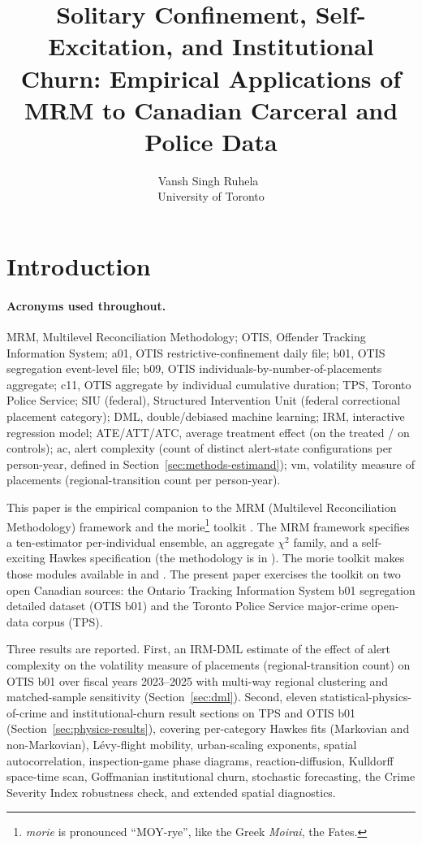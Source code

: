 \documentclass[article,shortnames,nojss]{jss}
\title{Solitary Confinement, Self-Excitation, and Institutional Churn: Empirical Applications of MRM to Canadian Carceral and Police Data}
\author{Vansh Singh Ruhela~\orcidlink{0009-0004-1750-3592}\\University of Toronto}
\newcommand{\OTIS}{\textsf{OTIS}}
\newcommand{\TPS}{\textsf{TPS}}
\newcommand{\ac}{\ensuremath{\mathrm{ac}}}
\newcommand{\vm}{\ensuremath{\mathrm{vm}}}
\begin{document}
\sloppy

\clearpage

\section{Introduction}
\label{sec:intro}

\paragraph*{Acronyms used throughout.}
MRM, Multilevel Reconciliation Methodology;
OTIS, Offender Tracking Information System;
a01, OTIS restrictive-confinement daily file;
b01, OTIS segregation event-level file;
b09, OTIS individuals-by-number-of-placements aggregate;
c11, OTIS aggregate by individual cumulative duration;
TPS, Toronto Police Service;
SIU (federal), Structured Intervention Unit (federal correctional placement category);
DML, double/debiased machine learning;
IRM, interactive regression model;
ATE/ATT/ATC, average treatment effect (on the treated / on controls);
\ac, alert complexity (count of distinct alert-state configurations per person-year, defined in Section~\ref{sec:methods-estimand});
\vm, volatility measure of placements (regional-transition count per person-year).

This paper is the empirical companion to the MRM (Multilevel Reconciliation Methodology)
framework \citep{Ruhela2026MRM} and the morie\footnote{\textit{morie}
is pronounced ``MOY-rye'', like the Greek \textit{Moirai},
the Fates.} toolkit
\citep{Ruhela2026MorieR, Ruhela2026MoriePy}. The MRM framework
specifies a ten-estimator per-individual ensemble, an aggregate
$\chi^{2}$ family, and a self-exciting Hawkes specification (the methodology is in
\citealt{Ruhela2026Hawkes}). The morie toolkit makes those modules
available in  and . The present paper
exercises the toolkit on two open Canadian sources: the Ontario
Tracking Information System b01 segregation detailed dataset
(\OTIS{} b01) and the Toronto Police Service major-crime open-data
corpus (\TPS{}).

Three results are reported. First, an IRM-DML estimate of the effect
of alert complexity on the volatility measure of placements (regional-transition count) on \OTIS{} b01 over fiscal
years 2023--2025 with multi-way regional clustering and matched-sample
sensitivity (Section~\ref{sec:dml}). Second, eleven statistical-physics-of-crime and institutional-churn
result sections on \TPS{} and \OTIS{} b01 (Section~\ref{sec:physics-results}),
covering per-category Hawkes fits (Markovian and non-Markovian),
L\'evy-flight mobility, urban-scaling exponents, spatial autocorrelation,
inspection-game phase diagrams, reaction-diffusion, Kulldorff
space-time scan, Goffmanian institutional churn, stochastic forecasting,
the Crime Severity Index robustness check, and extended spatial
diagnostics.
\end{document}
